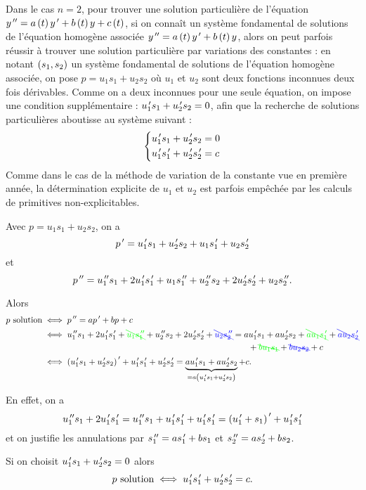 Dans le cas \(n=2\), pour trouver une solution particulière de l'équation \(y^{\,\prime\prime}=a\left(t\right)y^{\,\prime}+b\left(t\right)y+c\left(t\right)\), si on connaît un système fondamental de solutions de l'équation homogène associée \(y^{\,\prime\prime}=a\left(t\right)y^{\,\prime}+b\left(t\right)y\), alors on peut parfois réussir à trouver une solution particulière par variations des constantes : en notant \(\left(s_1,s_2\right)\) un système fondamental de solutions de l'équation homogène associée, on pose \(p=u_1s_1+u_2s_2\) où \(u_1\) et \(u_2\) sont deux fonctions inconnues deux fois dérivables. Comme on a deux inconnues pour une seule équation, on impose une condition supplémentaire : \(u_1^{\,\prime} s_1+u_2^{\,\prime} s_2=0\), afin que la recherche de solutions particulières aboutisse au système suivant : \[\begin{dcases}
u_1^{\,\prime} s_1+u_2^{\,\prime} s_2=0 \\
u_1^{\,\prime} s_1^{\,\prime}+u_2^{\,\prime} s_2^{\,\prime}=c
\end{dcases}\] Comme dans le cas de la méthode de variation de la constante vue en première année, la détermination explicite de \(u_1\) et \(u_2\) est parfois empêchée par les calculs de primitives non-explicitables.

\begin{dem}
Avec \(p=u_1s_1+u_2s_2\), on a \[p^{\,\prime}=u_1^{\,\prime} s_1+u_2^{\,\prime} s_2+u_1s_1^{\,\prime}+u_2s_2^{\,\prime}\] et \[p^{\,\prime\prime}=u_1^{\,\prime\prime} s_1+2u_1^{\,\prime} s_1^{\,\prime}+u_1s_1^{\,\prime\prime}+u_2^{\,\prime\prime} s_2+2u_2^{\,\prime} s_2^{\,\prime}+u_2s_2^{\,\prime\prime}.\]

Alors \[\begin{aligned}
p\text{ solution}&\ssi p\seconde=ap\prim+bp+c \\
&\ssi u_1\seconde s_1+2u_1\prim s_1\prim+\textcolor{green}{\bcancel{u_1s_1\seconde}}+u_2\seconde s_2+2u_2\prim s_2\prim+\textcolor{blue}{\bcancel{u_2s_2\seconde}}=au_1\prim s_1+au_2\prim s_2+\textcolor{green}{\bcancel{au_1s_1\prim}}+\textcolor{blue}{\bcancel{au_2s_2\prim}} \\
&\phantom{\ssi u_1\seconde s_1+2u_1\prim s_1\prim+u_1s_1\seconde+u_2\seconde s_2+2u_2\prim s_2\prim+u_2s_2\seconde=+}+\textcolor{green}{\bcancel{bu_1s_1}}+\textcolor{blue}{\bcancel{bu_2s_2}}+c \\
&\ssi\paren{u_1\prim s_1+u_2\prim s_2}\prim+u_1\prim s_1\prim+u_2\prim s_2\prim=\underbrace{au_1\prim s_1+au_2\prim s_2}_{=a\paren{u_1\prim s_1+u_2\prim s_2}}+c.
\end{aligned}\]

En effet, on a \[u_1^{\,\prime\prime} s_1+2u_1^{\,\prime} s_1^{\,\prime}=u_1^{\,\prime\prime} s_1+u_1^{\,\prime} s_1^{\,\prime}+u_1^{\,\prime} s_1^{\,\prime}=\left(u_1^{\,\prime}+s_1\right)^{\,\prime}+u_1^{\,\prime} s_1^{\,\prime}\] et on justifie les annulations par \(s_1^{\,\prime\prime}=as_1^{\,\prime}+bs_1\) et \(s_2^{\,\prime\prime}=as_2^{\,\prime}+bs_2\).

Si on choisit \(u_1^{\,\prime} s_1+u_2^{\,\prime} s_2=0\) alors \[p\text{ solution}\iff u_1^{\,\prime} s_1^{\,\prime}+u_2^{\,\prime} s_2^{\,\prime}=c.\]
\end{dem}

